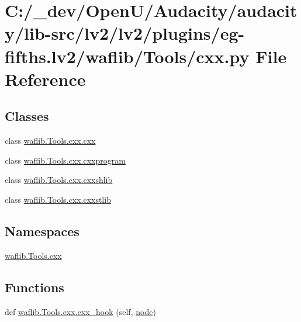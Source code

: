 \hypertarget{lv2_2plugins_2eg-fifths_8lv2_2waflib_2_tools_2cxx_8py}{}\section{C\+:/\+\_\+dev/\+Open\+U/\+Audacity/audacity/lib-\/src/lv2/lv2/plugins/eg-\/fifths.lv2/waflib/\+Tools/cxx.py File Reference}
\label{lv2_2plugins_2eg-fifths_8lv2_2waflib_2_tools_2cxx_8py}
\subsection*{Classes}
\begin{DoxyCompactItemize}
\item 
class \hyperlink{classwaflib_1_1_tools_1_1cxx_1_1cxx}{waflib.\+Tools.\+cxx.\+cxx}
\item 
class \hyperlink{classwaflib_1_1_tools_1_1cxx_1_1cxxprogram}{waflib.\+Tools.\+cxx.\+cxxprogram}
\item 
class \hyperlink{classwaflib_1_1_tools_1_1cxx_1_1cxxshlib}{waflib.\+Tools.\+cxx.\+cxxshlib}
\item 
class \hyperlink{classwaflib_1_1_tools_1_1cxx_1_1cxxstlib}{waflib.\+Tools.\+cxx.\+cxxstlib}
\end{DoxyCompactItemize}
\subsection*{Namespaces}
\begin{DoxyCompactItemize}
\item 
 \hyperlink{namespacewaflib_1_1_tools_1_1cxx}{waflib.\+Tools.\+cxx}
\end{DoxyCompactItemize}
\subsection*{Functions}
\begin{DoxyCompactItemize}
\item 
def \hyperlink{namespacewaflib_1_1_tools_1_1cxx_a31f0414cdfdb6dd749e0f65f788bfbda}{waflib.\+Tools.\+cxx.\+cxx\+\_\+hook} (self, \hyperlink{structnode}{node})
\end{DoxyCompactItemize}
